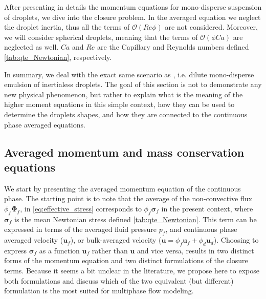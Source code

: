 After presenting in details the momentum equations for mono-disperse suspension of droplets, we dive into the closure problem. 
In the averaged equation we neglect the droplet inertia, thus all the terms of $\mathcal{O}(Re \phi)$ are not considered.
Moreover, we will consider spherical droplets, meaning that the terms of $\mathcal{O}(\phi Ca)$ are neglected as well.
$Ca$ and $Re$ are the Capillary and Reynolds numbers defined \ref{tab:qte_Newtonian}, respectively. 

In summary, we deal with the exact same scenario as \citet[Appendix A]{zhang1997momentum}, i.e. dilute mono-disperse emulsion of inertialess droplets. 
The goal of this section is not to demonstrate any new physical phenomenon, but rather to explain what is the meaning of the higher moment equations in this simple context, how they can be used to determine the droplets shapes, and how they are connected to the continuous phase averaged equations. 


\subsection{Averaged momentum and mass conservation equations}

We start by presenting the averaged momentum equation of the continuous phase. 
The starting point is to note that the average of the non-convective flux $\phi_f\bm\Phi_f$, in \ref{eq:effective_stress} corresponds to $\phi_f\bm\sigma_f$ in the present context, where $\bm\sigma_f$ is the mean Newtonian stress defined \ref{tab:qte_Newtonian}. 
This term can be expressed in terms of the averaged fluid pressure $p_f$, and continuous phase averaged velocity ($\textbf{u}_f$), or bulk-averaged velocity ($\textbf{u} = \phi_f \textbf{u}_f + \phi_d \textbf{u}_d$).
Choosing to express $\bm\sigma_f$ as a function $\textbf{u}_f$ rather than $\textbf{u}$ and vice versa, results in two distinct forms of the momentum equation and two distinct formulations of the closure terms. 
Because it seems a bit unclear in the literature, we propose here to expose both formulations and discuss which of the two equivalent (but different) formulation is the most suited for multiphase flow modeling. 

